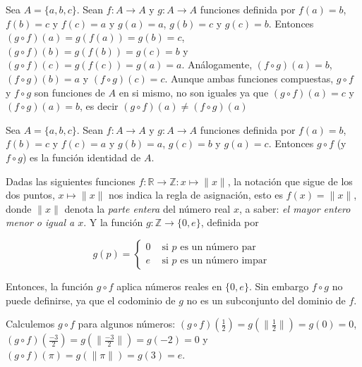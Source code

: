 \documentclass[12pt,]{krantz}
\theoremstyle{definition}
\theoremstyle{definition}
\theoremstyle{definition}
\theoremstyle{remark}
\let\BeginKnitrBlock\begin \let\EndKnitrBlock\end
\begin{document}
\BeginKnitrBlock{example}
\protect\hypertarget{exm:unnamed-chunk-37}{}{\label{exm:unnamed-chunk-37}
}Sea \(A=\{a,b,c\}\). Sean \(f:A\longrightarrow A\) y
\(g:A\longrightarrow A\) funciones definida por \(f(a)=b\), \(f(b)=c\) y
\(f(c)=a\) y \(g(a)=a\), \(g(b)=c\) y \(g(c)=b\). Entonces
\((g\circ f)(a)=g(f(a))=g(b)=c\), \((g\circ f)(b)=g(f(b))=g(c)=b\) y
\((g\circ f)(c)=g(f(c))=g(a)=a\). Análogamente, \((f\circ g)(a)=b\),
\((f\circ g)(b)=a\) y \((f\circ g)(c)=c\). Aunque ambas funciones
compuestas, \(g\circ f\) y \(f\circ g\) son funciones de \(A\) en si
mismo, no son iguales ya que \((g\circ f)(a)=c\) y \((f\circ g)(a)=b\),
es decir \((g\circ f)(a)\neq (f\circ g)(a)\)
\EndKnitrBlock{example}

\BeginKnitrBlock{example}
\protect\hypertarget{exm:unnamed-chunk-38}{}{\label{exm:unnamed-chunk-38}
}Sea \(A=\{a,b,c\}\). Sean \(f:A\longrightarrow A\) y
\(g:A\longrightarrow A\) funciones definida por \(f(a)=b\), \(f(b)=c\) y
\(f(c)=a\) y \(g(b)=a\), \(g(c)=b\) y \(g(a)=c\). Entonces \(g\circ f\)
(y \(f\circ g\)) es la función identidad de \(A\).
\EndKnitrBlock{example}

\BeginKnitrBlock{example}
\protect\hypertarget{exm:unnamed-chunk-39}{}{\label{exm:unnamed-chunk-39}
}Dadas las siguientes funciones
\(f:\mathbb{R}\longrightarrow \mathbb{Z}:x\longmapsto \lVert x\rVert\),
la notación que sigue de los dos puntos, \(x\longmapsto \lVert x\rVert\)
nos indica la regla de asignación, esto es \(f(x)=\lVert x\rVert\),
donde \(\lVert x\rVert\) denota la \textit{parte entera} del número real
\(x\), a saber: \textit{el mayor entero menor o igual a $x$}. Y la
función \(g:\mathbb{Z}\longrightarrow \{0,e\}\), definida por

\begin{equation}
    g(p) = \left\{
    \begin{array}{ll}
    0      & \mbox{ si } p \mbox{ es un número par } \\
    e      & \mbox{ si } p \mbox{ es un número impar }
 \end{array}
    \right.
\end{equation}

Entonces, la función \(g\circ f\) aplica números reales en \(\{0,e\}\).
Sin embargo \(f\circ g\) no puede definirse, ya que el codominio de
\(g\) no es un subconjunto del dominio de \(f\).

Calculemos \(g\circ f\) para algunos números:
\((g\circ f)(\frac{1}{2})=g(\lVert \frac{1}{2} \rVert)=g(0)=0\),
\((g\circ f)(\frac{-3}{2})=g(\lVert \frac{-3}{2} \rVert)=g(-2)=0\) y
\((g\circ f)(\pi)=g(\lVert \pi \rVert)=g(3)=e\).
\EndKnitrBlock{example}
\end{document}
